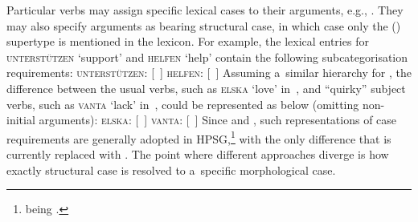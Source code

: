 \documentclass[output=paper
 	        ,biblatex
                ,babelshorthands
                ,newtxmath
                ,draftmode
                ,colorlinks, citecolor=brown
]{langscibook}
\begin{document}
Particular verbs may assign specific lexical cases to their arguments, e.g., .  They may also specify arguments as bearing structural case, in which case only the () supertype is mentioned in the lexicon.  For example, the lexical entries for \textsc{unterstützen} `support’ and \textsc{helfen} `help’ contain the following subcategorisation requirements:
\eal
\label{ex:hmsubcats}
\ex \textsc{unterst\"utzen}: [~] 
\ex \textsc{helfen}: [~]
\zl
Assuming a~similar  hierarchy for , the difference between the usual verbs, such as \textsc{elska} `love’ in~, and “quirky” subject verbs, such as \textsc{vanta} `lack’ in~, could be represented as below (omitting non-initial arguments):
\eal
\label{ex:islsubcats}
\ex \textsc{elska}: [~] 
\ex \textsc{vanta}: [~]
\zl
Since \citet{Pollard94a} and \citet{HM94a}, such representations of case requirements are generally adopted in HPSG,\footnote{ being  .} with the only difference that  is currently replaced with .  The point where different approaches diverge is how exactly structural case is resolved to a~specific morphological case.
\end{document}
